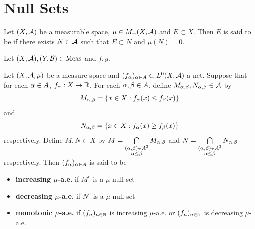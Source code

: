 \documentclass{book}
\begin{document}
	
	
	
	
	
	
	
	
	
	
	
	
	\section{Null Sets}

\begin{defn}
	Let $(X, \mathcal{A})$ be a measurable space, $\mu \in M_+(X, \mathcal{A})$ and $E \subset X$. Then $E$ is said to be  if there exists $N \in \mathcal{A}$ such that $E \subset N$ and $\mu(N) = 0$.
\end{defn}

\begin{ex}
\end{ex}


\begin{defn}
	Let $(X, \mathcal{A}), (Y, \mathcal{B}) \in \operatorname{\text{Meas}}$ and $f,g$. 
\end{defn}



\begin{defn} 
	Let $(X, \mathcal{A}, \mu)$ be a measure space and $(f_\alpha)_{\alpha \in A} \subset L^0(X, \mathcal{A})$ a net. Suppose that for each $\alpha \in A$, $f_{\alpha}:X \rightarrow \mathbb{R}$. For each $\alpha, \beta \in A$, define $M_{\alpha, \beta}, N_{\alpha, \beta} \in \mathcal{A}$ by
	$$M_{\alpha, \beta} = \{x \in X: f_{\alpha}(x) \leq f_{\beta}(x) \}$$ 
	and 
	$$N_{\alpha, \beta} = \{x \in X: f_{\alpha}(x) \geq f_{\beta}(x) \}$$
	respectively. Define $M,N \subset X$ by $M = \bigcap\limits_{\substack{(\alpha, \beta) \in A^2 \\ \alpha \leq \beta}} M_{\alpha, \beta}$ and $N = \bigcap\limits_{\substack{(\alpha, \beta) \in A^2 \\ \alpha \leq \beta}} N_{\alpha, \beta}$ respectively. Then $(f_{\alpha})_{\alpha \in A}$ is said to be 
	\begin{itemize}
		\item \textbf{increasing $\mu$-a.e.} if $M^c$ is a $\mu$-null set
		\item \textbf{decreasing $\mu$-a.e.} if $N^c$ is a $\mu$-null set
		\item \textbf{monotonic $\mu$-a.e.} if $(f_n)_{n \in \mathbb{N}}$ is increasing $\mu$-a.e. or $(f_n)_{n \in \mathbb{N}}$ is decreasing $\mu$-a.e.
	\end{itemize} 
\end{defn}
\end{document}
